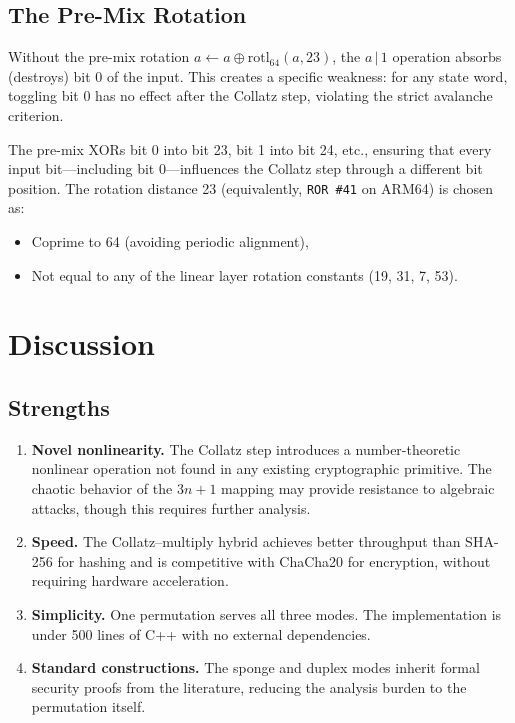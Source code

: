 \documentclass[11pt,a4paper]{article}
\newcommand{\rotl}{\mathrm{rotl}_{64}}
\begin{document}
\subsection{The Pre-Mix Rotation}

Without the pre-mix rotation $a \leftarrow a \oplus \rotl(a, 23)$,
the $a \,|\, 1$ operation absorbs (destroys) bit 0 of the input. This
creates a specific weakness: for any state word, toggling bit 0 has no
effect after the Collatz step, violating the strict avalanche criterion.

The pre-mix XORs bit 0 into bit 23, bit 1 into bit 24, etc., ensuring
that every input bit---including bit 0---influences the Collatz step
through a different bit position. The rotation distance 23 (equivalently,
\texttt{ROR \#41} on ARM64) is chosen as:
\begin{itemize}
    \item Coprime to 64 (avoiding periodic alignment),
    \item Not equal to any of the linear layer rotation constants
          (19, 31, 7, 53).
\end{itemize}

\section{Discussion}
\label{sec:discussion}

\subsection{Strengths}

\begin{enumerate}
    \item \textbf{Novel nonlinearity.} The Collatz step introduces a
          number-theoretic nonlinear operation not found in any existing
          cryptographic primitive. The chaotic behavior of the $3n+1$
          mapping may provide resistance to algebraic attacks, though
          this requires further analysis.
    \item \textbf{Speed.} The Collatz--multiply hybrid achieves better
          throughput than SHA-256 for hashing and is competitive with
          ChaCha20 for encryption, without requiring hardware
          acceleration.
    \item \textbf{Simplicity.} One permutation serves all three modes.
          The implementation is under 500 lines of C++ with no external
          dependencies.
    \item \textbf{Standard constructions.} The sponge and duplex modes
          inherit formal security proofs from the literature, reducing
          the analysis burden to the permutation itself.
\end{enumerate}
\end{document}
